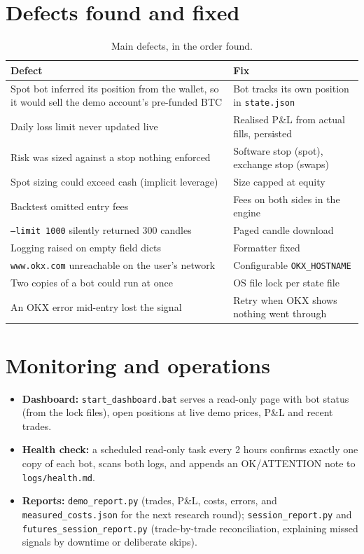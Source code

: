 \documentclass[11pt,a4paper]{article}
\newcommand{\code}[1]{\texttt{\small #1}}
\begin{document}
\section{Defects found and fixed}
\begin{table}[h]
\centering\small
\begin{tabularx}{\textwidth}{@{}lL@{}}
\toprule
Defect & Fix \\
\midrule
Spot bot inferred its position from the wallet, so it would sell the demo account's pre-funded
BTC & Bot tracks its own position in \code{state.json} \\
Daily loss limit never updated live & Realised P\&L from actual fills, persisted \\
Risk was sized against a stop nothing enforced & Software stop (spot), exchange stop (swaps) \\
Spot sizing could exceed cash (implicit leverage) & Size capped at equity \\
Backtest omitted entry fees & Fees on both sides in the engine \\
\code{--limit 1000} silently returned 300 candles & Paged candle download \\
Logging raised on empty field dicts & Formatter fixed \\
\code{www.okx.com} unreachable on the user's network & Configurable \code{OKX\_HOSTNAME} \\
Two copies of a bot could run at once & OS file lock per state file \\
An OKX error mid-entry lost the signal & Retry when OKX shows nothing went through \\
\bottomrule
\end{tabularx}
\caption{Main defects, in the order found.}
\end{table}

\section{Monitoring and operations}
\begin{itemize}
\item \textbf{Dashboard:} \code{start\_dashboard.bat} serves a read-only page with bot status
(from the lock files), open positions at live demo prices, P\&L and recent trades.
\item \textbf{Health check:} a scheduled read-only task every 2 hours confirms exactly one copy of
each bot, scans both logs, and appends an OK/ATTENTION note to \code{logs/health.md}.
\item \textbf{Reports:} \code{demo\_report.py} (trades, P\&L, costs, errors, and
\code{measured\_costs.json} for the next research round); \code{session\_report.py} and
\code{futures\_session\_report.py} (trade-by-trade reconciliation, explaining missed signals by
downtime or deliberate skips).
\end{itemize}
\end{document}
